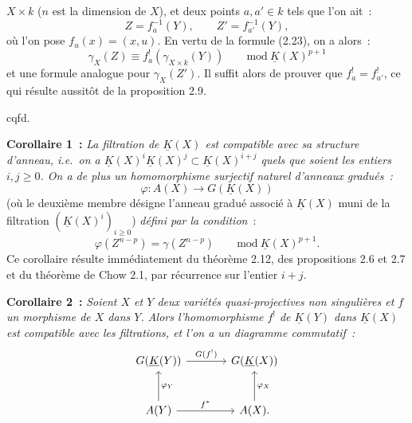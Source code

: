 $X\times k$ ($n$ est la
dimension de $X$), et deux points $a,a'\in k$ tels que l'on ait~:
\[
 Z=f_a^{-1}(Y),\qquad Z'=f_{a'}^{-1}(Y),
\]
où l'on pose $f_u(x)=(x,u)$. En vertu de la formule (2.23), on a alors~:
\[
 \gamma_X(Z)\equiv f_a^!(\gamma_{X\times k}(Y))\qquad\mathrm{mod}\ \underline K(X)^{p+1}
\]
et une formule analogue pour $\gamma_X(Z')$. Il suffit alors de prouver que $f_a^!=f_{a'}^!$, ce qui résulte aussitôt de la proposition 2.9.
\begin{flushright}cqfd.\end{flushright}

\textbf{Corollaire 1~:} \emph{La filtration de $\underline K(X)$ est compatible avec sa structure d'anneau, i.e.\ on a $\underline K(X)^i\underline K(X)^j\subset\underline K(X)^{i+j}$ quels que soient les entiers $i,j\geq0$. On a de plus un homomorphisme surjectif naturel d'anneaux gradués~:}
\begin{equation}\tag{2.34}
 \varphi:A(X)\longrightarrow G(\underline K(X))
\end{equation}
(où le deuxième membre désigne l'anneau gradué associé à $\underline K(X)$ muni de la filtration $(\underline K(X)^i)_{i\geq0}$) \emph{défini par la condition}~:
\[
 \varphi(Z^{n-p})=\gamma(Z^{n-p})\qquad\mathrm{mod}\ \underline K(X)^{p+1}.
\]
Ce corollaire résulte immédiatement du théorème 2.12, des propositions 2.6 et 2.7 et du théorème de Chow 2.1, par récurrence sur l'entier $i+j$.

\textbf{Corollaire 2~:} \emph{Soient $X$ et $Y$ deux variétés quasi-projectives non singulières et $f$ un morphisme de $X$ dans $Y$. Alors l'homomorphisme $f^!$ de $\underline K(Y)$ dans $\underline K(X)$ est compatible avec les filtrations, et l'on a un diagramme commutatif~:}
\[
\begin{tikzcd}[column sep=large,row sep=large]
G(\underline K(Y)) \arrow[r,"G(f^!)"] & G(\underline K(X))\\
A(Y) \arrow[r,"f^*"] \arrow[u,"\varphi_Y"'] & A(X) \arrow[u,"\varphi_X"'] .
\end{tikzcd}
\]
